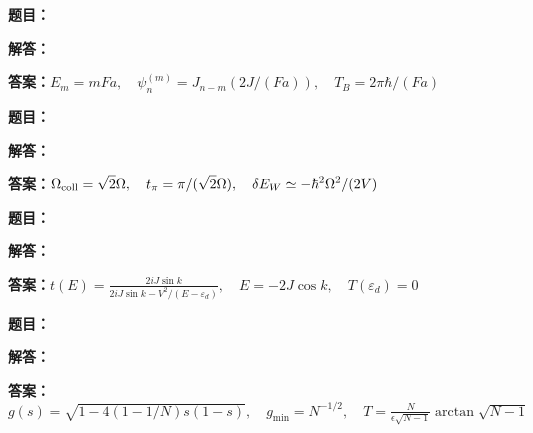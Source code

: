 \documentclass[lang=cn,color=blue,11pt]{elegantbook}
\begin{document}
\par\smallskip\noindent\hrulefill\par\medskip
{}\par
\noindent\textbf{题目：}
\par\noindent\textbf{解答：}
\par\noindent\textbf{答案：}\(\displaystyle E_m=mFa,\quad \psi_n^{(m)}=J_{n-m}(2J/(Fa)),\quad T_B=2\pi\hbar/(Fa)\)\par
\par\smallskip\noindent\hrulefill\par\medskip
{}\par
\noindent\textbf{题目：}
\par\noindent\textbf{解答：}
\par\noindent\textbf{答案：}\(\displaystyle \Omega_{\rm coll}=\sqrt2\Omega,\quad t_\pi=\pi/(\sqrt2\Omega),\quad \delta E_W\simeq-\hbar^2\Omega^2/(2V)\)\par
\par\smallskip\noindent\hrulefill\par\medskip
{}\par
\noindent\textbf{题目：}
\par\noindent\textbf{解答：}
\par\noindent\textbf{答案：}\(\displaystyle t(E)=\frac{2iJ\sin k}{2iJ\sin k-V^2/(E-\varepsilon_d)},\quad E=-2J\cos k,\quad T(\varepsilon_d)=0\)\par
\par\smallskip\noindent\hrulefill\par\medskip
{}\par
\noindent\textbf{题目：}
\par\noindent\textbf{解答：}
\par\noindent\textbf{答案：}\(\displaystyle g(s)=\sqrt{1-4(1-1/N)s(1-s)},\quad g_{\min}=N^{-1/2},\quad T=\frac{N}{\epsilon\sqrt{N-1}}\arctan\sqrt{N-1}\)\par
\end{document}
